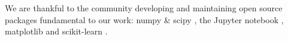 \documentclass[usenatbib]{mnras}
\begin{document}
We are thankful to the community developing and maintaining open source packages fundamental to our work: numpy
\&  scipy  \citep{VanDerWalt2011},  the  Jupyter  notebook  \citep{Kluyver2016}, matplotlib \citep{Hunter2007} and  scikit-learn \citep{Pedregosa2011}.






\bsp	%
\label{lastpage}
\end{document}
